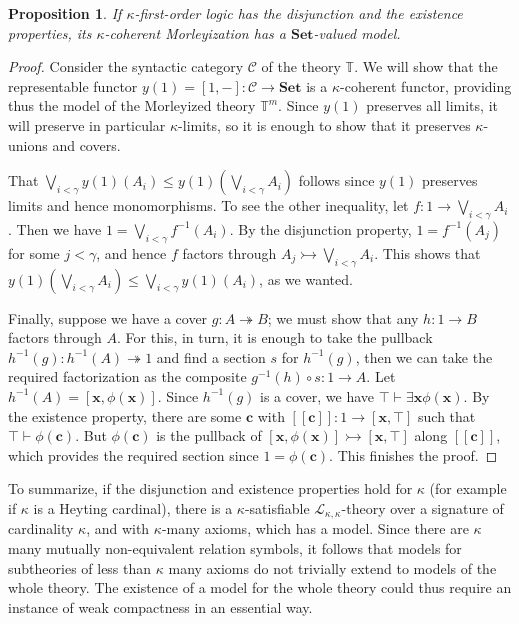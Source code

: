 \documentclass[a4paper,11pt]{article}
\theoremstyle{plain}
\newtheorem{proposition}[thm]{Proposition}
\theoremstyle{plain}
\theoremstyle{remark}
\newcommand{\Sets}{\ensuremath{\mathbf{Set}}}
\newcommand{\theory}{\ensuremath{\mathbb{T}}}
\begin{document}
\begin{proposition}
 If $\kappa$-first-order logic has the disjunction and the existence properties, its $\kappa$-coherent Morleyization has a \Sets-valued model.
\end{proposition}

\begin{proof}
 Consider the syntactic category $\mathcal{C}$ of the theory $\theory$. We will show that the representable functor $y(1)=[1, -]: \mathcal{C} \to \Sets$ is a $\kappa$-coherent functor, providing thus the model of the Morleyized theory $\theory^m$. Since $y(1)$ preserves all limits, it will preserve in particular $\kappa$-limits, so it is enough to show that it preserves $\kappa$-unions and covers.
 
 That $\bigvee_{i<\gamma} y(1)(A_i) \leq y(1)(\bigvee_{i<\gamma}A_i)$ follows since $y(1)$ preserves limits and hence monomorphisms. To see the other inequality, let $f: 1 \to \bigvee_{i<\gamma}A_i$. Then we have $1=\bigvee_{i<\gamma}f^{-1}(A_i)$. By the disjunction property, $1=f^{-1}(A_j)$ for some $j<\gamma$, and hence $f$ factors through $A_j \rightarrowtail \bigvee_{i<\gamma}A_i$. This shows that $y(1)(\bigvee_{i<\gamma}A_i) \leq \bigvee_{i<\gamma} y(1)(A_i)$, as we wanted.
 
 Finally, suppose we have a cover $g: A \twoheadrightarrow B$; we must show that any $h: 1 \to B$ factors through $A$. For this, in turn, it is enough to take the pullback $h^{-1}(g): h^{-1}(A) \twoheadrightarrow 1$ and find a section $s$ for $h^{-1}(g)$, then we can take the required factorization as the composite $g^{-1}(h) \circ s: 1 \to A$. Let $h^{-1}(A)=[\mathbf{x}, \phi(\mathbf{x})]$. Since $h^{-1}(g)$ is a cover, we have $\top \vdash \exists \mathbf{x} \phi(\mathbf{x})$. By the existence property, there are some $\mathbf{c}$ with $[\![\mathbf{c}]\!]: 1 \to [\mathbf{x}, \top]$ such that $\top \vdash \phi(\mathbf{c})$. But $\phi(\mathbf{c})$ is the pullback of $[\mathbf{x}, \phi(\mathbf{x})] \rightarrowtail [\mathbf{x}, \top]$ along $[\![\mathbf{c}]\!]$, which provides the required section since $1=\phi(\mathbf{c})$. This finishes the proof. 
\end{proof}

To summarize, if the disjunction and existence properties hold for $\kappa$ (for example if $\kappa$ is a Heyting cardinal), there is a $\kappa$-satisfiable $\mathcal{L}_{\kappa, \kappa}$-theory over a signature of cardinality $\kappa$, and with $\kappa$-many axioms, which has a model. Since there are $\kappa$ many mutually non-equivalent relation symbols, it follows that models for subtheories of less than $\kappa$ many axioms do not trivially extend to models of the whole theory. The existence of a model for the whole theory could thus require an instance of weak compactness in an essential way.
\end{document}
